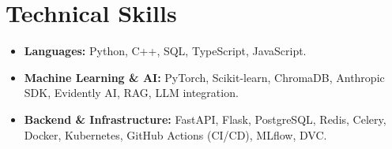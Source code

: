 \documentclass[letterpaper,11pt]{article}
\begin{document}
\section{Technical Skills}
\begin{itemize}[leftmargin=0.0in, label={}]
  \item \small \textbf{Languages:}{ Python, C++, SQL, TypeScript, JavaScript.}
  \item \small \textbf{Machine Learning \& AI:}{ PyTorch, Scikit-learn, ChromaDB, Anthropic SDK, Evidently AI, RAG, LLM integration.}
  \item \small \textbf{Backend \& Infrastructure:}{ FastAPI, Flask, PostgreSQL, Redis, Celery, Docker, Kubernetes, GitHub Actions (CI/CD), MLflow, DVC.}
\end{itemize}
\end{document}
